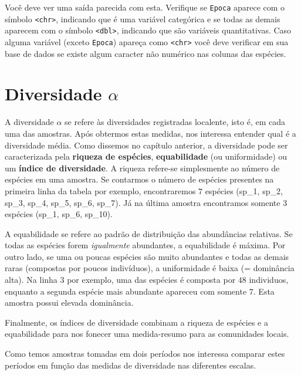 \documentclass[
]{book}
\begin{document}
Você deve ver uma saída parecida com esta. Verifique se \texttt{Epoca} aparece com o símbolo \texttt{\textless{}chr\textgreater{}}, indicando que é uma variável categórica e se todas as demais aparecem com o símbolo \texttt{\textless{}dbl\textgreater{}}, indicando que são variáveis quantitativas. Caso alguma variável (exceto \texttt{Epoca}) apareça como \texttt{\textless{}chr\textgreater{}} você deve verificar em sua base de dados se existe algum caracter não numérico nas colunas das espécies.

\hypertarget{diversidade-alpha}{%
\section{\texorpdfstring{Diversidade \(\alpha\)}{Diversidade \textbackslash alpha}}\label{diversidade-alpha}}

A diversidade \(\alpha\) se refere às diversidades registradas localente, isto é, em cada uma das amostras. Após obtermos estas medidas, nos interessa entender qual é a diversidade média. Como dissemos no capítulo anterior, a diversidade pode ser caracterizada pela \textbf{riqueza de espécies}, \textbf{equabilidade} (ou uniformidade) ou um \textbf{índice de diversidade}. A riqueza refere-se simplesmente ao número de espécies em uma amostra. Se contarmos o número de espécies presentes na primeira linha da tabela por exemplo, encontraremos \(7\) espécies (sp\_1, sp\_2, sp\_3, sp\_4, sp\_5, sp\_6, sp\_7). Já na última amostra encontramos somente \(3\) espécies (sp\_1, sp\_6, sp\_10).

A equabilidade se refere ao padrão de distribuição das abundâncias relativas. Se todas as espécies forem \emph{igualmente} abundantes, a equabilidade é máxima. Por outro lado, se uma ou poucas espécies são muito abundantes e todas as demais raras (compostas por poucos indivíduos), a uniformidade é baixa (= dominância alta). Na linha \(3\) por exemplo, uma das espécies é composta por \(48\) individuos, enquanto a segunda espécie mais abundante apareceu com somente \(7\). Esta amostra possui elevada dominância.

Finalmente, os índices de diversidade combinam a riqueza de espécies e a equabilidade para nos fonecer uma medida-resumo para as comunidades locais.

Como temos amostras tomadas em dois períodos nos interessa comparar estes períodos em função das medidas de diversidade nas diferentes escalas.
\end{document}
